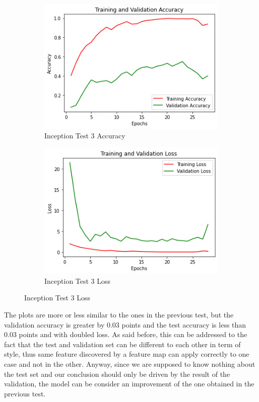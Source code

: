 \begin{figure}[H]
	\begin{subfigure}{0.5\textwidth}
		\includegraphics[width=0.9\linewidth]{img/inception/inceptionft2acc.png} 
		\caption{Inception Test 3 Accuracy}
		\label{fig:inceptionft2acc}
	\end{subfigure}
	\begin{subfigure}{0.5\textwidth}
		\includegraphics[width=0.9\linewidth]{img/inception/inceptionft2loss.png}
		\caption{Inception Test 3 Loss}
		\label{fig:inceptionft2loss}
	\end{subfigure}
\end{figure}

The plots are more or less similar to the ones in the previous test, but the validation accuracy is greater by 0.03 points and the test accuracy is less than 0.03 points and with doubled loss. As said before, this can be addressed to the fact that the test and validation set can be different to each other in term of style, thus same feature discovered by a feature map can apply correctly to one case and not in the other. Anyway, since we are supposed to know nothing about the test set and our conclusion should only be driven by the result of the validation, the model can be consider an improvement of the one obtained in the previous test.

